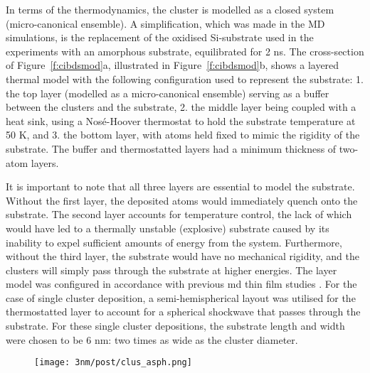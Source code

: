 \begin{changebar}
In terms of the thermodynamics, the cluster is modelled as a closed system (micro-canonical ensemble). A simplification, which was made in the MD simulations, is the replacement of the oxidised Si-substrate used in the experiments \cite{Benel2018,Benel2019} with an amorphous \cz  substrate, equilibrated for 2 ns. The cross-section of Figure~\ref{f:cibdsmod}a, illustrated in Figure~\ref{f:cibdsmod}b, shows a layered thermal model with the following configuration used to represent the substrate: 1. the top layer (modelled as a micro-canonical ensemble) serving as a buffer between the clusters and the substrate, 2. the middle layer being coupled with a heat sink, using a Nosé-Hoover thermostat to hold the substrate temperature at 50 K, and 3. the bottom layer, with atoms held fixed to mimic the rigidity of the substrate. The buffer and thermostatted layers had a minimum thickness of two-atom layers. \par 

It is important to note that all three layers are essential to model the substrate. Without the first layer, the deposited atoms would immediately quench onto the substrate. The second layer accounts for temperature control, the lack of which would have led to a thermally unstable (explosive) substrate caused by its inability to expel sufficient amounts of energy from the system. Furthermore, without the third layer, the substrate would have no mechanical rigidity, and the clusters will simply pass through the substrate at higher energies. The layer model was configured in accordance with previous \gls{md} thin film studies \cite{Haberland1993,Haberland1995,Rahmati2020}. For the case of single cluster deposition, a semi-hemispherical layout was utilised for the thermostatted layer to account for a spherical shockwave that passes through the substrate. For these single cluster depositions, the substrate length and width were chosen to be 6 nm: two times as wide as the cluster diameter. \par

\begin{figure}[!h]
\centering
\texttt{[image: 3nm/post/clus\_asph.png]}
\label{f:cibdsasph}
\end{figure}%


\end{changebar}
